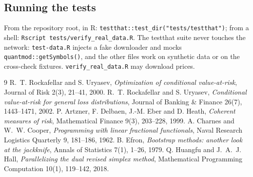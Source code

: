 \documentclass[11pt,a4paper]{article}
\newcommand{\code}[1]{\texttt{#1}}
\newcommand{\file}[1]{\texttt{#1}}
\theoremstyle{plain}
\theoremstyle{remark}
\begin{document}
\subsection{Running the tests}

From the repository root, in R: \code{testthat::test\_dir("tests/testthat")};
from a shell: \code{Rscript tests/verify\_real\_data.R}. The testthat suite
never touches the network: \file{test-data.R} injects a fake downloader and
mocks \code{quantmod::getSymbols()}, and the other files work on synthetic
data or on the cross-check fixtures. \file{verify\_real\_data.R} may
download prices.

\begin{thebibliography}{9}
 R.~T. Rockafellar and S. Uryasev,
  \emph{Optimization of conditional value-at-risk},
  Journal of Risk 2(3), 21--41, 2000.
 R.~T. Rockafellar and S. Uryasev,
  \emph{Conditional value-at-risk for general loss distributions},
  Journal of Banking \& Finance 26(7), 1443--1471, 2002.
 P. Artzner, F. Delbaen, J.-M. Eber and D. Heath,
  \emph{Coherent measures of risk}, Mathematical Finance 9(3), 203--228, 1999.
 A. Charnes and W.~W. Cooper,
  \emph{Programming with linear fractional functionals},
  Naval Research Logistics Quarterly 9, 181--186, 1962.
 B. Efron, \emph{Bootstrap methods: another look at the
  jackknife}, Annals of Statistics 7(1), 1--26, 1979.
 Q. Huangfu and J.~A.~J. Hall,
  \emph{Parallelizing the dual revised simplex method},
  Mathematical Programming Computation 10(1), 119--142, 2018.
\end{thebibliography}
\end{document}
